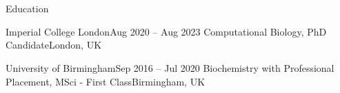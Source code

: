 \section{\faGraduationCap}{Education}

  \resumeEntryStart
    \resumeEntryTSDL
      {Imperial College London}{Aug 2020 -- Aug 2023}
      {Computational Biology, PhD Candidate}{London, UK}
  \vspace{6pt}
  
    \resumeEntryTSDL
      {University of Birmingham}{Sep 2016 -- Jul 2020}
      {Biochemistry with Professional Placement, MSci - First Class}{Birmingham, UK}
  \resumeEntryEnd
